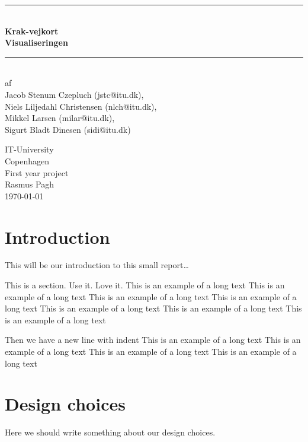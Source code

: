 \documentclass[a4paper,11pt]{article}
\begin{document}
\begin{titlepage}
\centering \parindent=0pt
\newcommand{\HRule}{\rule{\textwidth}{1mm}}
 \HRule\\[1cm]\Huge\bfseries
Krak-vejkort\\[0.7cm]
\large Visualiseringen\\[1cm]
\HRule\\[4cm]  \large af \\Jacob Stenum Czepluch (jstc@itu.dk), \\Niels Liljedahl Christensen (nlch@itu.dk), \\Mikkel Larsen (milar@itu.dk), \\Sigurt Bladt Dinesen (sidi@itu.dk) \\
 \normalsize %
\begin{flushleft}
IT-University\\
Copenhagen\\
First year project\\
Rasmus Pagh\\
\today \end{flushleft}
\end{titlepage}

\tableofcontents
\pagebreak

\pagebreak
\section{Introduction}

This will be our introduction to this small report\ldots


This is a section. Use it. Love it.
This is an example of a long text
This is an example of a long text
This is an example of a long text
This is an example of a long text
This is an example of a long text
This is an example of a long text
This is an example of a long text

Then we have a new line with indent
This is an example of a long text
This is an example of a long text
This is an example of a long text
This is an example of a long text

\pagebreak
\section{Design choices} %
\label{sec:Design choices}
Here we should write something about our design choices.
\end{document}
